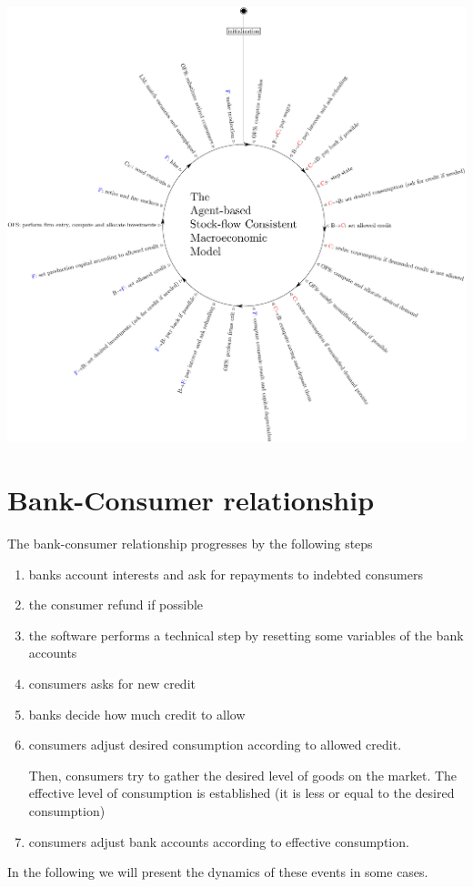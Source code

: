 \documentclass{article}
\begin{document}
\includegraphics[scale=0.5]{visual.pdf}

\section{Bank-Consumer relationship}
The bank-consumer relationship progresses by the following steps

\begin{enumerate}
	\item banks account interests and ask for repayments to indebted consumers
	\item the consumer refund if possible
	\item the software performs a technical step by resetting some variables of the bank accounts
	\item consumers asks for new credit
	\item banks decide how much credit to allow
	\item consumers adjust desired consumption according to allowed credit. 
		
		Then, consumers try to gather the desired level of goods on the market. The effective level of consumption is established (it is less or equal to the desired consumption)
	\item consumers adjust bank accounts according to effective consumption.
\end{enumerate}
In the following we will present the dynamics of these events in some cases.
\end{document}
